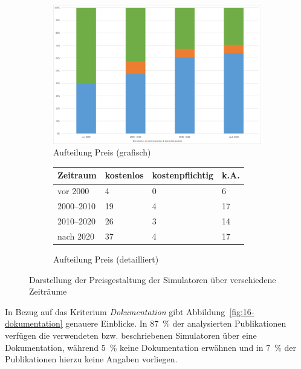 \begin{figure}[!htbp]
    \centering
    \begin{subfigure}[b]{0.48\textwidth}
        \centering
        \includegraphics[width=\textwidth]{graphics/15-preis-jahr.png}
        \caption{Aufteilung Preis (grafisch)}
        \label{fig:15-preis-jahr}
    \end{subfigure}
    \hfill
    \begin{subfigure}[b]{0.48\textwidth}
        \centering
        \tiny
        \begin{tabularx}{\textwidth}{lXXX}
            \hline
            \textbf{Zeitraum} & \textbf{kostenlos} & \textbf{kostenpflichtig} & \textbf{k.A.} \\
            \hline
            vor 2000      & 4  & 0 & 6  \\
            2000--2010    & 19 & 4 & 17 \\
            2010--2020    & 26 & 3 & 14 \\
            nach 2020     & 37 & 4 & 17 \\
            \hline
        \end{tabularx}
        \caption{Aufteilung Preis (detailliert)}
        \label{tab:15-preis-zeit}
    \end{subfigure}
    \caption{Darstellung der Preisgestaltung der Simulatoren über verschiedene Zeiträume}
    \label{fig:15-preis-gesamt}
\end{figure}

In Bezug auf das Kriterium \textit{Dokumentation} gibt Abbildung~\ref{fig:16-dokumentation} genauere Einblicke. In 87~\% der analysierten Publikationen verfügen die verwendeten bzw. beschriebenen Simulatoren über eine Dokumentation, während 5~\% keine Dokumentation erwähnen und in 7~\% der Publikationen hierzu keine Angaben vorliegen.

